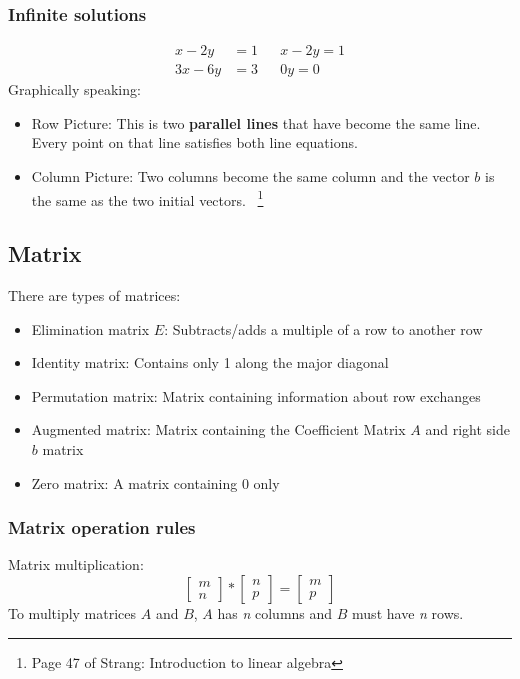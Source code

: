 \documentclass[10pt,a4paper]{article}
\begin{document}
\subsubsection{Infinite solutions}
\begin{align*} 
	x - 2y &=  1 && x-2y =1\\ 
	3x - 6y &=  3 && 0y=0
\end{align*}
Graphically speaking:
\begin{itemize}
	\item Row Picture: This is two \textbf{parallel lines} that have become the same line. Every
	point on that line satisfies both line equations.
	\item Column Picture: Two columns become the same column and the vector $b$ is the same as the two initial vectors. \ \footnote{Page 47 of Strang: Introduction to linear algebra}
\end{itemize} 
\subsection{Matrix}
There are types of matrices:
\begin{itemize}
	\item Elimination matrix $E$: Subtracts/adds a multiple of a row to another row
	\item Identity matrix: Contains only 1 along the major diagonal
	\item Permutation matrix: Matrix containing information about row exchanges
	\item Augmented matrix: Matrix containing the Coefficient Matrix $A$ and right side $b$ matrix
	\item Zero matrix: A matrix containing 0 only
\end{itemize}
\subsubsection{Matrix operation rules}
Matrix multiplication:
$$\begin{bmatrix}
	m \\
	n 
	\end{bmatrix} * \begin{bmatrix}
		n \\
		p 
		\end{bmatrix} = 
		\begin{bmatrix}
			m \\
			p 
		\end{bmatrix} $$
To multiply matrices $A$ and $B$, $A$ has \textit{n} columns and $B$ must have \textit{n} rows.
\end{document}
